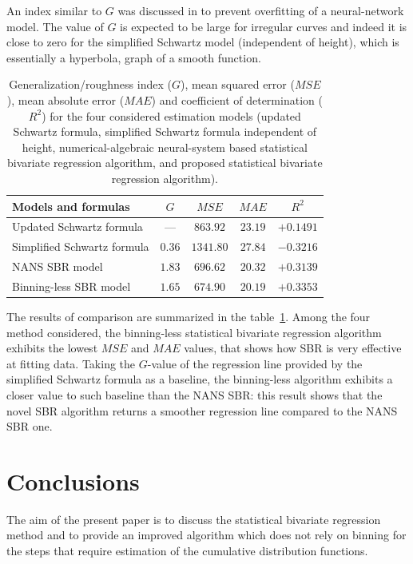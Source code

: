 \documentclass[10pt,final]{siamltex}
\begin{document}
%
An index similar to $\mathit{G}$ was discussed in \cite{bishop} to prevent overfitting of a neural-network model.
The value of $G$ is expected to be large for irregular curves and indeed it is close to zero for the simplified Schwartz model (independent of height), which is essentially a hyperbola, graph of a smooth function.
%
\begin{table}[ht]
  \centering
  \begin{tabular}{|l|c|c|c|c|}
    \hline
    \textbf{Models and formulas}             &$\mathit{G}$  &$\mathit{MSE}$  &$\mathit{MAE}$  &$R^2$    \\
    \hline
    Updated Schwartz formula          & ---  &$863.92$  &$23.19$  &$ +0.1491$  \\
    Simplified Schwartz formula       &$0.36$  &$1341.80$ &$27.84$  &$-0.3216$  \\
    NANS SBR model                  &$1.83$  &$696.62$  &$20.32$  &$ +0.3139$  \\
    Binning-less SBR model           &$1.65$  &$674.90$  &$20.19$  &$ +0.3353$  \\
    \hline
  \end{tabular}
  \caption{Generalization/roughness index ($\mathit{G}$), mean squared error ($\mathit{MSE}$), mean absolute error ($\mathit{MAE}$) and coefficient of determination ($R^2$) for the four considered estimation models (updated Schwartz formula, simplified Schwartz formula independent of height, numerical-algebraic neural-system based statistical bivariate regression algorithm, and proposed statistical bivariate regression algorithm).}
  \label{regstats}
\end{table}

The results of comparison are summarized in the table~\ref{regstats}. Among the four method considered, the binning-less statistical bivariate regression algorithm exhibits the lowest $\textit{MSE}$ and $\textit{MAE}$ values, that shows how SBR is very effective at fitting data. Taking the $G$-value of the regression line provided by the simplified Schwartz formula as a baseline, the binning-less algorithm exhibits a closer value to such baseline than the NANS SBR: this result shows that the novel SBR algorithm returns a smoother regression line compared to the NANS SBR one.
%
\section{Conclusions}\label{conclusion}
%
The aim of the present paper is to discuss the statistical  bivariate regression method and to provide an improved algorithm which does not rely on binning for the steps that require estimation of the cumulative distribution functions. 
\end{document}
